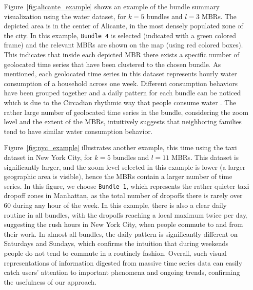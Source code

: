 Figure~\ref{fig:alicante_example} shows an example of the bundle summary visualization using the water dataset, for $k=5$ bundles and $l=3$ MBRs. The depicted area is in the center of Alicante, in the most densely populated zone of the city. In this example, \texttt{Bundle 4} is selected (indicated with a green colored frame) and the relevant MBRs are shown on the map (using red colored boxes). This indicates that inside each depicted MBR there exists a specific number of geolocated time series that have been clustered to the chosen bundle. As mentioned, each geolocated time series in this dataset represents hourly water consumption of a household across one week. Different consumption behaviors have been grouped together and a daily pattern for each bundle can be noticed which is due to the Circadian rhythmic way that people consume water \cite{aschoff1965circadian}. The rather large number of geolocated time series in the bundle, considering the zoom level and the extent of the MBRs, intuitively suggests that neighboring families tend to have similar water consumption behavior. 

Figure~\ref{fig:nyc_example} illustrates another example, this time using the taxi dataset in New York City, for $k=5$ bundles and $l=11$ MBRs. This dataset is significantly larger, and the zoom level selected in this example is lower (a larger geographic area is visible), hence the MBRs contain a larger number of time series. In this figure, we choose \texttt{Bundle 1}, which represents the rather quieter taxi dropoff zones in Manhattan, as the total number of dropoffs there is rarely over 60 during any hour of the week. In this example, there is also a clear daily routine in all bundles, with the dropoffs reaching a local maximum twice per day, suggesting the rush hours in New York City, when people commute to and from their work. In almost all bundles, the daily pattern is significantly different on Saturdays and Sundays, which confirms the intuition that during weekends people do not tend to commute in a routinely fashion. Overall, such visual representations of information digested from massive time series data can easily catch users' attention to important phenomena and ongoing trends, confirming the usefulness of our approach.

